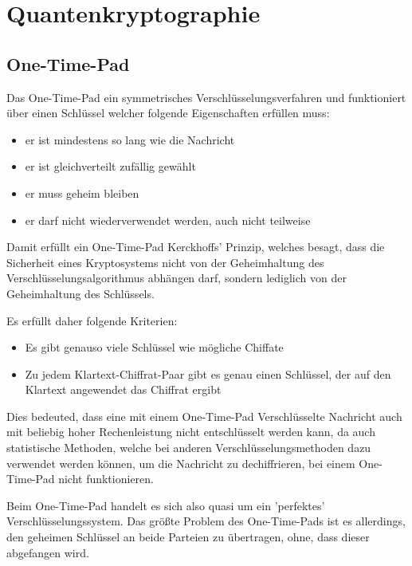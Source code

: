 
\section{Quantenkryptographie}
\label{sec:Quantenkryptographie}

\subsection{One-Time-Pad}

Das One-Time-Pad ein symmetrisches Verschlüsselungsverfahren und funktioniert über einen Schlüssel welcher folgende Eigenschaften erfüllen muss: \cite{onetimepadwiki}
\begin{itemize}
    \item er ist mindestens so lang wie die Nachricht
    \item er ist gleichverteilt zufällig gewählt
    \item er muss geheim bleiben
    \item er darf nicht wiederverwendet werden, auch nicht teilweise
\end{itemize}

Damit erfüllt ein One-Time-Pad Kerckhoffs’ Prinzip, welches besagt, dass die Sicherheit eines Kryptosystems nicht von der Geheimhaltung des Verschlüsselungsalgorithmus abhängen darf, sondern lediglich von der Geheimhaltung des Schlüssels.\cite{onetimepadwiki}

Es erfüllt daher folgende Kriterien:

\begin{itemize}
    \item Es gibt genauso viele Schlüssel wie mögliche Chiffate
    \item Zu jedem Klartext-Chiffrat-Paar gibt es genau einen Schlüssel, der auf den Klartext angewendet das Chiffrat ergibt
\end{itemize}

Dies bedeuted, dass eine mit einem One-Time-Pad Verschlüsselte Nachricht auch mit beliebig hoher Rechenleistung nicht entschlüsselt werden kann, \cite{cryptintroduction} da auch statistische Methoden, welche bei anderen Verschlüsselungsmethoden dazu verwendet werden können, um die Nachricht zu dechiffrieren, bei einem One-Time-Pad nicht funktionieren.

Beim One-Time-Pad handelt es sich also quasi um ein 'perfektes' Verschlüsselungssystem. 
Das größte Problem des One-Time-Pads ist es allerdings, den geheimen Schlüssel an beide Parteien zu übertragen, ohne, dass dieser abgefangen wird.


